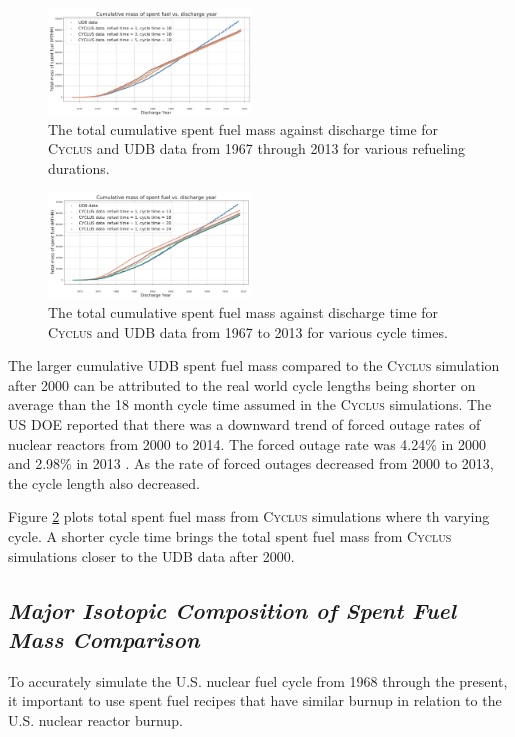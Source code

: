 \documentclass{anstrans}
\newcommand{\Cyclus}{\textsc{Cyclus}\xspace}%
\begin{document}
\begin{figure}[t] 
	\centering
	\includegraphics[width=0.48\textwidth]{figures/total_cumulative_mass_spent_fuel_refueltime}
	\caption{The total cumulative spent fuel mass against discharge time for \Cyclus and \gls{UDB} data from 1967 through 2013 for various refueling durations.}
	\label{fig:total_refueltime}
\end{figure} 

\begin{figure}[b] %
	\centering
	\includegraphics[width=0.48\textwidth]{figures/total_cumulative_mass_spent_fuel_cycletime}
	\caption{The total cumulative spent fuel mass against discharge time for \Cyclus and \gls{UDB} data from 1967 to 2013 for various cycle times.}
	\label{fig:total_cycletime}
\end{figure} 

The larger cumulative \gls{UDB} spent fuel mass compared to the \Cyclus simulation 
after 2000 can be attributed to the real world cycle lengths being shorter on 
average than the 18 month cycle time assumed in the  \Cyclus simulations. The 
\gls{US} \gls{DOE} reported that there was a downward trend of forced outage 
rates of nuclear reactors from 2000 to 2014. The forced outage rate was 4.24\% 
in 2000 and 2.98\% in 2013 \cite{gehin_nuclear_2016}. As the rate of forced 
outages decreased from 2000 to 2013, the cycle length also decreased. 

Figure \ref{fig:total_cycletime} plots total spent fuel mass from 
\Cyclus simulations where th varying cycle. A shorter cycle time brings the 
total spent fuel mass from \Cyclus simulations closer to the \gls{UDB} data after 
2000. 

\subsection{\textit{Major Isotopic Composition of  Spent Fuel Mass Comparison}}
To accurately simulate the U.S. nuclear fuel cycle from 1968 through the present, 
it important to use spent fuel recipes that have similar burnup in relation to 
the U.S. nuclear reactor burnup. 
\end{document}
